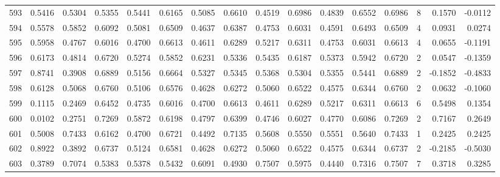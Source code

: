 \begin{tabular}{lrrrrrrrrrrrrrrr}
593 &      0.5416 &  0.5304 &  0.5355 &  0.5441 &  0.6165 &  0.5085 &  0.6610 &  0.4519 &  0.6986 &  0.4839 &   0.6552 &     0.6986 &      8 &                    0.1570 &                    -0.0112 \\
594 &      0.5578 &  0.5852 &  0.6092 &  0.5081 &  0.6509 &  0.4637 &  0.6387 &  0.4753 &  0.6031 &  0.4591 &   0.6493 &     0.6509 &      4 &                    0.0931 &                     0.0274 \\
595 &      0.5958 &  0.4767 &  0.6016 &  0.4700 &  0.6613 &  0.4611 &  0.6289 &  0.5217 &  0.6311 &  0.4753 &   0.6031 &     0.6613 &      4 &                    0.0655 &                    -0.1191 \\
596 &      0.6173 &  0.4814 &  0.6720 &  0.5274 &  0.5852 &  0.6231 &  0.5336 &  0.5435 &  0.6187 &  0.5373 &   0.5942 &     0.6720 &      2 &                    0.0547 &                    -0.1359 \\
597 &      0.8741 &  0.3908 &  0.6889 &  0.5156 &  0.6664 &  0.5327 &  0.5345 &  0.5368 &  0.5304 &  0.5355 &   0.5441 &     0.6889 &      2 &                   -0.1852 &                    -0.4833 \\
598 &      0.6128 &  0.5068 &  0.6760 &  0.5106 &  0.6576 &  0.4628 &  0.6272 &  0.5060 &  0.6522 &  0.4575 &   0.6344 &     0.6760 &      2 &                    0.0632 &                    -0.1060 \\
599 &      0.1115 &  0.2469 &  0.6452 &  0.4735 &  0.6016 &  0.4700 &  0.6613 &  0.4611 &  0.6289 &  0.5217 &   0.6311 &     0.6613 &      6 &                    0.5498 &                     0.1354 \\
600 &      0.0102 &  0.2751 &  0.7269 &  0.5872 &  0.6198 &  0.4797 &  0.6399 &  0.4746 &  0.6027 &  0.4770 &   0.6086 &     0.7269 &      2 &                    0.7167 &                     0.2649 \\
601 &      0.5008 &  0.7433 &  0.6162 &  0.4700 &  0.6721 &  0.4492 &  0.7135 &  0.5608 &  0.5550 &  0.5551 &   0.5640 &     0.7433 &      1 &                    0.2425 &                     0.2425 \\
602 &      0.8922 &  0.3892 &  0.6737 &  0.5124 &  0.6581 &  0.4628 &  0.6272 &  0.5060 &  0.6522 &  0.4575 &   0.6344 &     0.6737 &      2 &                   -0.2185 &                    -0.5030 \\
603 &      0.3789 &  0.7074 &  0.5383 &  0.5378 &  0.5432 &  0.6091 &  0.4930 &  0.7507 &  0.5975 &  0.4440 &   0.7316 &     0.7507 &      7 &                    0.3718 &                     0.3285 \\

\end{tabular}
